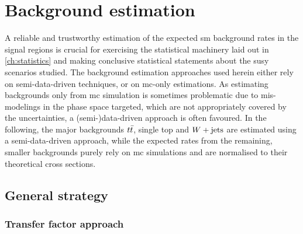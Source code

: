 

\chapter{Background estimation}\label{ch:background_estimation}

\graphicspath{{chapter-background/Figs/Vector/}{chapter-background/Figs/}}


A reliable and trustworthy estimation of the expected \gls{sm} background rates in the signal regions is crucial for exercising the statistical machinery laid out in \cref{ch:statistics} and making conclusive statistical statements about the \gls{susy} scenarios studied.
The background estimation approaches used herein either rely on semi-data-driven techniques, or on \gls{mc}-only estimations.
As estimating backgrounds only from \gls{mc} simulation is sometimes problematic due to \eg mis-modelings in the phase space targeted, which are not appropriately covered by the uncertainties, a (semi-)data-driven approach is often favoured.
In the following, the major backgrounds $t\bar{t}$, single top and $W+\mathrm{jets}$ are estimated using a semi-data-driven approach, while the expected rates from the remaining, smaller backgrounds purely rely on \gls{mc} simulations and are normalised to their theoretical cross sections.

\section{General strategy}

\subsection{Transfer factor approach}

